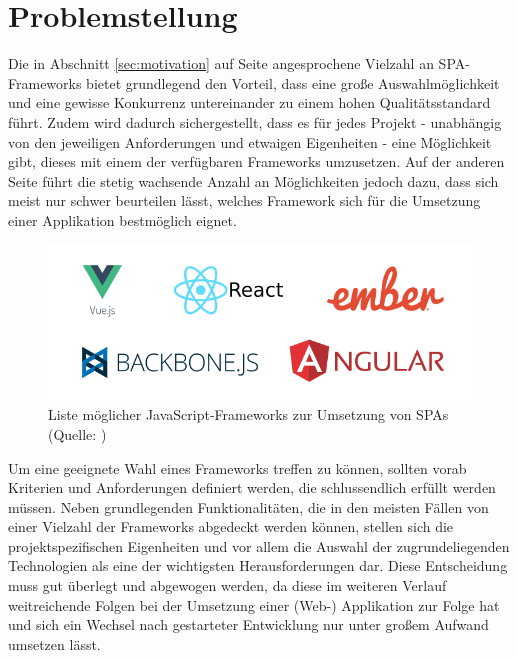 \documentclass[a4paper,12pt,twoside]{scrreprt}
\begin{document}
\section{Problemstellung}
\label{sec:problemstellung}
Die in Abschnitt \ref{sec:motivation} auf Seite \pageref{sec:motivation} angesprochene Vielzahl an \acs{SPA}-Frameworks bietet grundlegend den Vorteil, dass eine große Auswahlmöglichkeit und eine gewisse Konkurrenz untereinander zu einem hohen Qualitätsstandard führt. Zudem wird dadurch sichergestellt, dass es für jedes Projekt - unabhängig von den jeweiligen Anforderungen und etwaigen Eigenheiten - eine Möglichkeit gibt, dieses mit einem der verfügbaren Frameworks umzusetzen. Auf der anderen Seite führt die stetig wachsende Anzahl an Möglichkeiten jedoch dazu, dass sich meist nur schwer beurteilen lässt, welches Framework sich für die Umsetzung einer Applikation bestmöglich eignet.

\begin{figure}[ht]
    \centering
    \includegraphics[scale=0.5]{images/js-frameworks.png}
    \caption[Liste möglicher JavaScript-Frameworks zur Umsetzung von \aclp{SPA}]{Liste möglicher JavaScript-Frameworks zur Umsetzung von \aclp{SPA} (Quelle: \cite[][]{a_best_2020})}
    \label{fig:js-frameworks}
\end{figure}

Um eine geeignete Wahl eines Frameworks treffen zu können, sollten vorab Kriterien und Anforderungen definiert werden, die schlussendlich erfüllt werden müssen. Neben grundlegenden Funktionalitäten, die in den meisten Fällen von einer Vielzahl der Frameworks abgedeckt werden können, stellen sich die projektspezifischen Eigenheiten und vor allem die Auswahl der zugrundeliegenden Technologien als eine der wichtigsten Herausforderungen dar. Diese Entscheidung muss gut überlegt und abgewogen werden, da diese im weiteren Verlauf weitreichende Folgen bei der Umsetzung einer (Web-) Applikation zur Folge hat und sich ein Wechsel nach gestarteter Entwicklung nur unter großem Aufwand umsetzen lässt.
\end{document}
